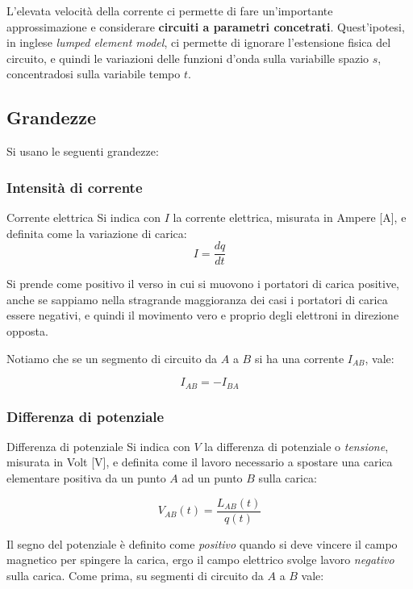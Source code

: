 \documentclass[a4paper,11pt]{article}
\begin{document}
L'elevata velocità della corrente ci permette di fare un'importante approssimazione e considerare \textbf{circuiti a parametri concetrati}.
Quest'ipotesi, in inglese \textit{lumped element model}, ci permette di ignorare l'estensione fisica del circuito, e quindi le variazioni delle funzioni d'onda sulla variabille spazio $s$, concentradosi sulla variabile tempo $t$.

\subsection{Grandezze}
Si usano le seguenti grandezze:
\subsubsection{Intensità di corrente}

\begin{definition}{Corrente elettrica}	
Si indica con $I$ la corrente elettrica, misurata in Ampere [$\mathrm{A}$], e definita come la variazione di carica:
$$
I = \frac{dq}{dt}
$$
\end{definition}

Si prende come positivo il verso in cui si muovono i portatori di carica positive, anche se sappiamo nella stragrande maggioranza dei casi i portatori di carica essere negativi, e quindi il movimento vero e proprio degli elettroni in direzione opposta.

Notiamo che se un segmento di circuito da $A$ a $B$ si ha una corrente $I_{AB}$, vale:

$$
I_{AB} = -I_{BA}
$$

\subsubsection{Differenza di potenziale}

\begin{definition}{Differenza di potenziale}
Si indica con $V$ la differenza di potenziale o \textit{tensione}, misurata in Volt [$\mathrm{V}$], e definita come il lavoro necessario a spostare una carica elementare positiva da un punto $A$ ad un punto $B$ sulla carica:

$$
	V_{AB}(t) = \frac{L_{AB}(t)}{q(t)}
$$
\end{definition}

Il segno del potenziale è definito come \textit{positivo} quando si deve vincere il campo magnetico per spingere la carica, ergo il campo elettrico svolge lavoro \textit{negativo} sulla carica.
Come prima, su segmenti di circuito da $A$ a $B$ vale:
\end{document}
